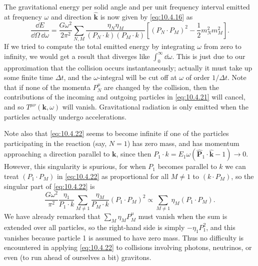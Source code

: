 The gravitational energy per solid angle and per unit frequency interval
emitted at frequency \(\omega\) and direction \(\widehat{\mathbf{k}}\) is
now given by \eqref{eq:10.4.16} as
\begin{equation}
  \frac{\dd E}{\dd\Omega\,\dd\omega}
  =
  \frac{G\omega^2}{2\pi^2}
  \sum_{N,M}
  \frac{\eta_N\eta_M}
       {(P_N\cdot k)(P_M\cdot k)}
  \left[
    (P_N\cdot P_M)^2-\frac12m_N^2m_M^2
  \right].
  \tag{10.4.22}\label{eq:10.4.22}
\end{equation}
If we tried to compute the total emitted energy by integrating \(\omega\)
from zero to infinity, we would get a result that diverges like
\(\int_0^\infty \dd\omega\). This is just due to our approximation that the
collision occurs instantaneously; actually it must take up some finite time
\(\Delta t\), and the \(\omega\)-integral will be cut off at \(\omega\) of
order \(1/\Delta t\). Note that if none of the momenta \(P_N^\mu\) are
changed by the collision, then the contributions of the incoming and outgoing
particles in \eqref{eq:10.4.21} will cancel, and so
\(T^{\mu\nu}(\mathbf{k},\omega)\) will vanish. Gravitational radiation is
only emitted when the particles actually undergo accelerations.

Note also that \eqref{eq:10.4.22} seems to become infinite if one of the
particles participating in the reaction (say, \(N=1\)) has zero mass, and
has momentum approaching a direction parallel to \(\mathbf{k}\), since then
\(P_1\cdot k=E_1\omega
(\widehat{\mathbf{P}}_1\cdot\widehat{\mathbf{k}}-1)\to0\). However, this
singularity is spurious, for when \(P_1\) becomes parallel to \(k\) we can
treat \((P_1\cdot P_M)\) in \eqref{eq:10.4.22} as proportional for all
\(M\ne1\) to \((k\cdot P_M)\), so the singular part of
\eqref{eq:10.4.22} is
\[
  \frac{G\omega^2}{\pi^2}
  \frac{\eta_1}{P_1\cdot k}
  \sum_{M\ne1}\frac{\eta_M}{P_M\cdot k}(P_1\cdot P_M)^2
  \propto
  \sum_{M\ne1}\eta_M(P_1\cdot P_M).
\]
We have already remarked that \(\sum_M\eta_MP_M^\mu\) must vanish when the
sum is extended over all particles, so the right-hand side is simply
\(-\eta_1P_1^2\), and this vanishes because particle 1 is assumed to have
zero mass. Thus no difficulty is encountered in applying
\eqref{eq:10.4.22} to collisions involving photons, neutrinos, or even (to
run ahead of ourselves a bit) gravitons.

